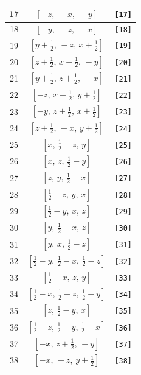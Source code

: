 \documentclass[fleqn,8pt]{jsarticle}
\begin{document}
\begin{longtable}{ccc}
17 & $\left[ - z,\, - x,\, - y \right]$ & {\tt [17]} \\ \hline
18 & $\left[ - y,\, - z,\, - x \right]$ & {\tt [18]} \\ \hline
19 & $\left[ y + \frac{1}{2},\, - z,\, x + \frac{1}{2} \right]$ & {\tt [19]} \\ \hline
20 & $\left[ z + \frac{1}{2},\, x + \frac{1}{2},\, - y \right]$ & {\tt [20]} \\ \hline
21 & $\left[ y + \frac{1}{2},\, z + \frac{1}{2},\, - x \right]$ & {\tt [21]} \\ \hline
22 & $\left[ - z,\, x + \frac{1}{2},\, y + \frac{1}{2} \right]$ & {\tt [22]} \\ \hline
23 & $\left[ - y,\, z + \frac{1}{2},\, x + \frac{1}{2} \right]$ & {\tt [23]} \\ \hline
24 & $\left[ z + \frac{1}{2},\, - x,\, y + \frac{1}{2} \right]$ & {\tt [24]} \\ \hline
25 & $\left[ x,\, \frac{1}{2} - z,\, y \right]$ & {\tt [25]} \\ \hline
26 & $\left[ x,\, z,\, \frac{1}{2} - y \right]$ & {\tt [26]} \\ \hline
27 & $\left[ z,\, y,\, \frac{1}{2} - x \right]$ & {\tt [27]} \\ \hline
28 & $\left[ \frac{1}{2} - z,\, y,\, x \right]$ & {\tt [28]} \\ \hline
29 & $\left[ \frac{1}{2} - y,\, x,\, z \right]$ & {\tt [29]} \\ \hline
30 & $\left[ y,\, \frac{1}{2} - x,\, z \right]$ & {\tt [30]} \\ \hline
31 & $\left[ y,\, x,\, \frac{1}{2} - z \right]$ & {\tt [31]} \\ \hline
32 & $\left[ \frac{1}{2} - y,\, \frac{1}{2} - x,\, \frac{1}{2} - z \right]$ & {\tt [32]} \\ \hline
33 & $\left[ \frac{1}{2} - x,\, z,\, y \right]$ & {\tt [33]} \\ \hline
34 & $\left[ \frac{1}{2} - x,\, \frac{1}{2} - z,\, \frac{1}{2} - y \right]$ & {\tt [34]} \\ \hline
35 & $\left[ z,\, \frac{1}{2} - y,\, x \right]$ & {\tt [35]} \\ \hline
36 & $\left[ \frac{1}{2} - z,\, \frac{1}{2} - y,\, \frac{1}{2} - x \right]$ & {\tt [36]} \\ \hline
37 & $\left[ - x,\, z + \frac{1}{2},\, - y \right]$ & {\tt [37]} \\ \hline
38 & $\left[ - x,\, - z,\, y + \frac{1}{2} \right]$ & {\tt [38]} \\ \hline

\end{longtable}
\end{document}
